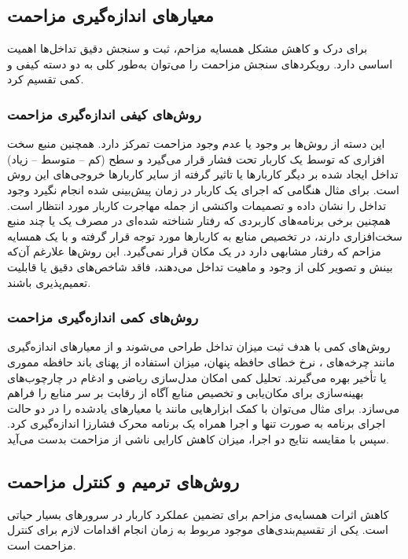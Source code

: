 \subsection{معیارهای اندازه‌گیری مزاحمت}

برای درک و کاهش مشکل همسایه مزاحم، ثبت و سنجش دقیق تداخل‌ها اهمیت اساسی دارد. رویکردهای سنجش مزاحمت را می‌توان به‌طور کلی به دو دسته کیفی و کمی تقسیم کرد.

\subsubsection{روش‌های کیفی اندازه‌گیری مزاحمت}

این دسته از روش‌ها بر وجود یا عدم وجود مزاحمت تمرکز دارد. همچنین منبع سخت افزاری که توسط یک کاربار تحت فشار قرار می‌گیرد و سطح (کم – متوسط – زیاد) تداخل ایجاد شده بر دیگر کاربارها یا تاثیر گرفته از سایر کاربارها خروجی‌های این روش است. برای مثال هنگامی که اجرای یک کاربار در زمان پیش‌بینی شده انجام نگیرد وجود تداخل را نشان داده و تصمیمات واکنشی از جمله مهاجرت کاربار مورد انتظار است. همچنین برخی برنامه‌های کاربردی که رفتار شناخته شده‌ای در مصرف یک یا چند منبع سخت‌افزاری دارند، در تخصیص منابع به کاربارها مورد توجه قرار گرفته و با یک همسایه مزاحم که رفتار مشابهی دارد در یک مکان قرار نمی‌گیرد. این روش‌ها علارغم آن‌که بینش و تصویر کلی از وجود و ماهیت تداخل می‌دهند،‌ فاقد شاخص‌های دقیق یا قابلیت تعمیم‌پذیری باشند.

\subsubsection{روش‌های کمی اندازه‌گیری مزاحمت}

روش‌های کمی با هدف ثبت میزان تداخل طراحی می‌شوند و از معیارهای اندازه‌گیری مانند چرخه‌های ، نرخ خطای حافظه پنهان، میزان استفاده از پهنای باند حافظه مموری یا تأخیر  بهره می‌گیرند. تحلیل کمی امکان مدل‌سازی ریاضی و ادغام در چارچوب‌های بهینه‌سازی برای مکان‌یابی و تخصیص منابع آگاه از رقابت بر سر منابع را فراهم می‌سازد. برای مثال می‌توان با کمک ابزارهایی مانند  یا  معیارهای یادشده را در دو حالت اجرای برنامه به صورت تنها و اجرا همراه یک برنامه محرک فشارزا اندازه‌گیری کرد. سپس با مقایسه نتایج دو اجرا، میزان کاهش کارایی ناشی از مزاحمت بدست می‌آید.

\subsection{روش‌های ترمیم و کنترل مزاحمت}

کاهش اثرات همسایه‌ی مزاحم برای تضمین عملکرد کاربار در سرورهای  بسیار حیاتی است. یکی از تقسیم‌بندی‌های موجود مربوط به زمان انجام اقدامات لازم برای کنترل مزاحمت است. 

